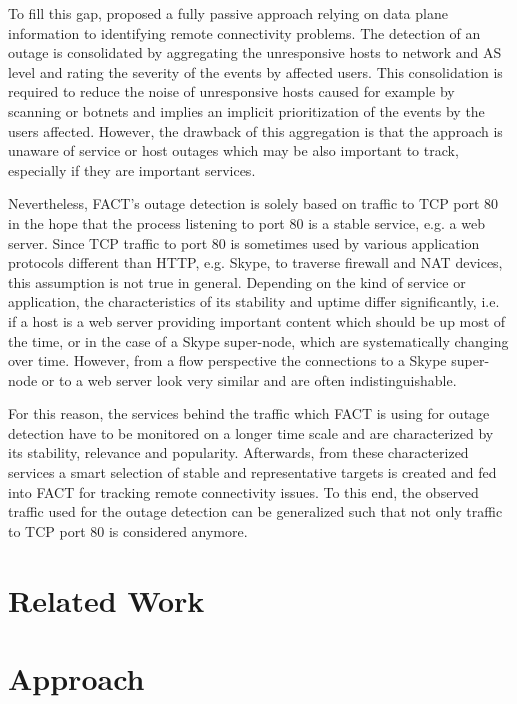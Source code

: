 \documentclass{sigcomm-alternate}
\begin{document}
To fill this gap, \cite{SchatzmannPAM2011} proposed a fully passive approach relying on data plane information to identifying remote connectivity problems. The detection of an outage is consolidated by aggregating the unresponsive hosts to network and AS level and rating the severity of the events by affected users. This consolidation is required to reduce the noise of unresponsive hosts caused for example by scanning or botnets and implies an implicit prioritization of the events by the users affected. However, the drawback of this aggregation is that the approach is unaware of service or host outages which may be also important to track, especially if they are important services.

Nevertheless, FACT's outage detection is solely based on traffic to TCP port 80 in the hope that the process listening to port 80 is a stable service, e.g. a web server. Since TCP traffic to port 80 is sometimes used by various application protocols different than HTTP, e.g. Skype, to traverse firewall and NAT devices, this assumption is not true in general. Depending on the kind of service or application, the characteristics of its stability and uptime differ significantly, i.e. if a host is a web server providing important content which should be up most of the time, or in the case of a Skype super-node, which are systematically changing over time. However, from a flow perspective the connections to a Skype super-node or to a web server look very similar and are often indistinguishable.

For this reason, the services behind the traffic which FACT is using for outage detection have to be monitored on a longer time scale and are characterized by its stability, relevance and popularity. Afterwards, from these characterized services a smart selection of stable and representative targets is created and fed into FACT for tracking remote connectivity issues. To this end, the observed traffic used for the outage detection can be generalized such that not only traffic to TCP port 80 is considered anymore. 


\section{Related Work}



\section{Approach}
\end{document}
